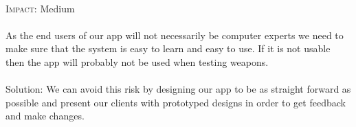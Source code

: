 \paragraph{}\textsc{Impact:} Medium
\paragraph{} As the end users of our app will not necessarily be computer experts we need to make sure that the system is easy to learn and easy to use. If it is not usable then the app will probably not be used when testing weapons.
\\
\\Solution: We can avoid this risk by designing our app to be as straight forward as possible and present our clients with prototyped designs in order to get feedback and make changes.
